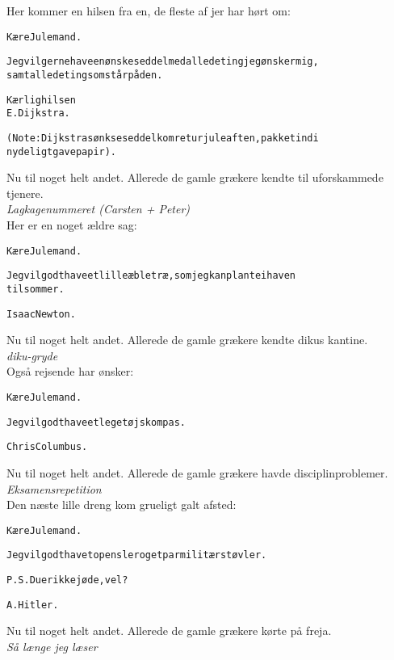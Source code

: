 \documentclass[a4paper,11pt]{article}
\begin{document}
\pagebreak

\noindent
Her kommer en hilsen fra en, de fleste af jer har h\o{}rt om:
\begin{alltt}
{\rm
K\ae{}re Julemand.

Jeg vil gerne have en \o{}nskeseddel med alle de ting jeg \o{}nsker mig,
samt alle de ting som st\aa{}r p\aa{} den.

                                 K\ae{}rlig hilsen
                                 E. Dijkstra.

(Note: Dijkstras \o{}nkseseddel kom retur juleaften, pakket ind i
nydeligt gavepapir).
}
\end{alltt}
Nu til noget helt andet. Allerede de gamle gr\ae{}kere kendte til uforskammede tjenere. \\
{\em Lagkagenummeret (Carsten + Peter)} \\
Her er en noget \ae{}ldre sag: \\
\begin{alltt}
{\rm
K\ae{}re Julemand.

Jeg vil godt have et lille \ae{}bletr\ae{}, som jeg kan plante i haven
til sommer.

                            Isaac Newton.
}
\end{alltt}
Nu til noget helt andet. Allerede de gamle gr\ae{}kere kendte {\sc
diku}s kantine. \\
{\em {\sc diku}-gryde} \\
Ogs\aa{} rejsende har \o{}nsker: \\
\begin{alltt}
{\rm
K\ae{}re Julemand.

Jeg vil godt have et leget\o{}jskompas.

                            Chris Columbus.
}
\end{alltt}
Nu til noget helt andet. Allerede de gamle gr\ae{}kere havde disciplinproblemer. \\
{\em Eksamensrepetition} \\
Den n\ae{}ste lille dreng kom grueligt galt afsted: 
\begin{alltt}
{\rm
K\ae{}re Julemand.

Jeg vil godt have to pensler og et par milit\ae{}rst\o{}vler.

P.S. Du er ikke j\o{}de, vel ?

                            A. Hitler.
}
\end{alltt}
Nu til noget helt andet. Allerede de gamle gr\ae{}kere k\o{}rte p\aa{} freja. \\
{\em S\aa{} l\ae{}nge jeg l\ae{}ser} \\
\end{document}
